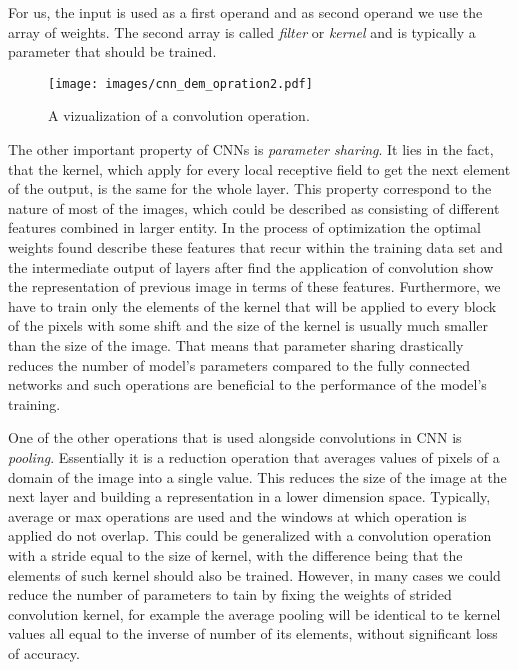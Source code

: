 For us, the input is used as a first operand and as second operand we use the array of weights.
The second array is called \emph{filter} or \emph{kernel} and is typically a parameter that should be trained. 
\medskip
\begin{figure}
	\centering
	\texttt{[image: images/cnn\_dem\_opration2.pdf]}
	\caption{A vizualization of a convolution operation.}
	\label{fig:convoper_demo}
\end{figure}
\medskip

The other important property of CNNs is \emph{parameter sharing}. 
It lies in the fact, that the kernel, which apply for every local receptive field to get the next element of the output, is the same for the whole layer. 
This property correspond to the nature of most of the images, which could be described as consisting of different features combined in larger entity.
In the process of optimization the optimal weights found describe these features that recur within the training data set and the intermediate output of layers after find the application of convolution show the representation of previous image in terms of these features.
Furthermore, we have to train only the elements of the kernel that will be applied to every block of the pixels with some shift and the size of the kernel is usually much smaller than the size of the image.
That means that parameter sharing drastically reduces the number of model's parameters compared to the fully connected networks and such operations are beneficial to the performance of the model's training.
\medskip

One of the other operations that is used alongside convolutions in CNN is \textit{pooling}.
Essentially it is a reduction operation that averages values of pixels of a domain of the image into a single value.
This reduces the size of the image at the next layer and building a representation in a lower dimension space. 
Typically, average or max operations are used and the windows at which operation is applied do not overlap.
This could be generalized with a convolution operation with a stride equal to the size of kernel, with the difference being that the elements of such kernel should also be trained.
However, in many cases we could reduce the number of parameters to tain by fixing the weights of strided convolution kernel, for example the average pooling will be identical to te kernel values all equal to the inverse of number of its elements, without significant loss of accuracy\cite{}.
\medskip

